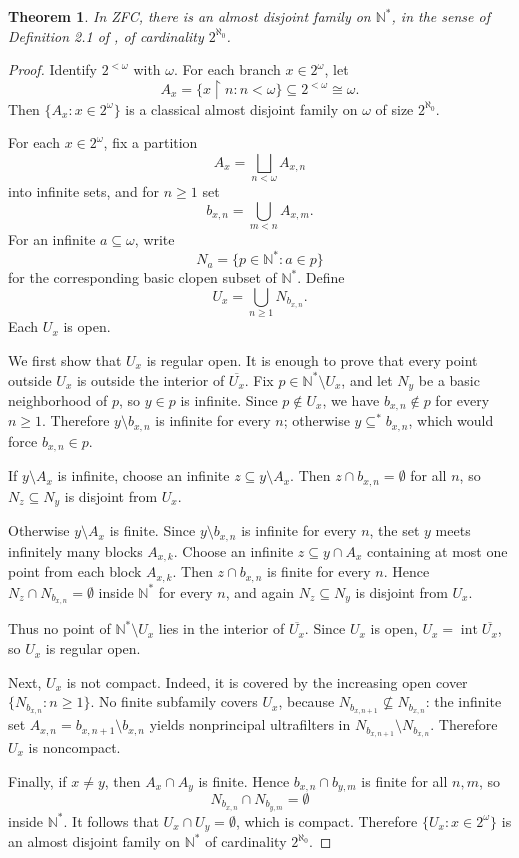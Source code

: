 \documentclass[11pt]{article}
\newtheorem{theorem}{Theorem}
\newcommand{\restr}{\upharpoonright}
\begin{document}
\begin{theorem}
In ZFC, there is an almost disjoint family on \(\mathbb N^*\), in the sense of
Definition 2.1 of \cite{LHS2026}, of cardinality \(2^{\aleph_0}\).
\end{theorem}

\begin{proof}
Identify \(2^{<\omega}\) with \(\omega\). For each branch \(x\in 2^\omega\),
let
\[
  A_x=\{x\restr n:n<\omega\}\subseteq 2^{<\omega}\cong \omega.
\]
Then \(\{A_x:x\in 2^\omega\}\) is a classical almost disjoint family on
\(\omega\) of size \(2^{\aleph_0}\).

For each \(x\in 2^\omega\), fix a partition
\[
  A_x=\bigsqcup_{n<\omega} A_{x,n}
\]
into infinite sets, and for \(n\geq 1\) set
\[
  b_{x,n}=\bigcup_{m<n} A_{x,m}.
\]
For an infinite \(a\subseteq\omega\), write
\[
  N_a=\{p\in\mathbb N^*:a\in p\}
\]
for the corresponding basic clopen subset of \(\mathbb N^*\). Define
\[
  U_x=\bigcup_{n\geq 1}N_{b_{x,n}}.
\]
Each \(U_x\) is open.

We first show that \(U_x\) is regular open. It is enough to prove that every
point outside \(U_x\) is outside the interior of \(\overline{U_x}\). Fix
\(p\in\mathbb N^*\setminus U_x\), and let \(N_y\) be a basic neighborhood of
\(p\), so \(y\in p\) is infinite. Since \(p\notin U_x\), we have
\(b_{x,n}\notin p\) for every \(n\geq 1\). Therefore \(y\setminus b_{x,n}\)
is infinite for every \(n\); otherwise \(y\subseteq^* b_{x,n}\), which would
force \(b_{x,n}\in p\).

If \(y\setminus A_x\) is infinite, choose an infinite
\(z\subseteq y\setminus A_x\). Then \(z\cap b_{x,n}=\emptyset\) for all \(n\),
so \(N_z\subseteq N_y\) is disjoint from \(U_x\).

Otherwise \(y\setminus A_x\) is finite. Since \(y\setminus b_{x,n}\) is
infinite for every \(n\), the set \(y\) meets infinitely many blocks
\(A_{x,k}\). Choose an infinite \(z\subseteq y\cap A_x\) containing at most
one point from each block \(A_{x,k}\). Then \(z\cap b_{x,n}\) is finite for
every \(n\). Hence \(N_z\cap N_{b_{x,n}}=\emptyset\) inside \(\mathbb N^*\)
for every \(n\), and again \(N_z\subseteq N_y\) is disjoint from \(U_x\).

Thus no point of \(\mathbb N^*\setminus U_x\) lies in the interior of
\(\overline{U_x}\). Since \(U_x\) is open, \(U_x=\operatorname{int}
\overline{U_x}\), so \(U_x\) is regular open.

Next, \(U_x\) is not compact. Indeed, it is covered by the increasing open
cover \(\{N_{b_{x,n}}:n\geq 1\}\). No finite subfamily covers \(U_x\), because
\(N_{b_{x,n+1}}\not\subseteq N_{b_{x,n}}\): the infinite set
\(A_{x,n}=b_{x,n+1}\setminus b_{x,n}\) yields nonprincipal ultrafilters in
\(N_{b_{x,n+1}}\setminus N_{b_{x,n}}\). Therefore \(U_x\) is noncompact.

Finally, if \(x\neq y\), then \(A_x\cap A_y\) is finite. Hence
\(b_{x,n}\cap b_{y,m}\) is finite for all \(n,m\), so
\[
  N_{b_{x,n}}\cap N_{b_{y,m}}=\emptyset
\]
inside \(\mathbb N^*\). It follows that \(U_x\cap U_y=\emptyset\), which is
compact. Therefore \(\{U_x:x\in2^\omega\}\) is an almost disjoint family on
\(\mathbb N^*\) of cardinality \(2^{\aleph_0}\).
\end{proof}
\end{document}

